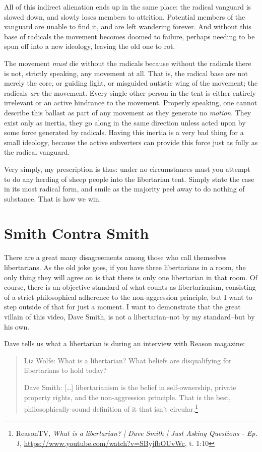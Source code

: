 \documentclass[11pt]{article}
\begin{document}
All of this indirect alienation ends up in the same place: the radical vanguard is slowed down, and slowly loses members to attrition. Potential members of the vanguard are unable to find it, and are left wandering forever. And without this base of radicals the movement becomes doomed to failure, perhaps needing to be spun off into a new ideology, leaving the old one to rot.

The movement \emph{must} die without the radicals because without the radicals there is not, strictly speaking, any movement at all. That is, the radical base are not merely the core, or guiding light, or misguided autistic wing of the movement; the radicals \emph{are} the movement. Every single other person in the tent is either entirely irrelevant or an active hindrance to the movement. Properly speaking, one cannot describe this ballast as part of any movement as they generate no \emph{motion}. They exist only as inertia, they go along in the same direction unless acted upon by some force generated by radicals. Having this inertia is a very bad thing for a small ideology, because the active subverters can provide this force just as fully as the radical vanguard.

Very simply, my prescription is thus: under no circumstances must you attempt to do any herding of sheep people into the libertarian tent. Simply state the case in its most radical form, and smile as the majority peel away to do nothing of substance. That is how we win.
\section{Smith Contra Smith}
\label{sec:orged01f03}
There are a great many disagreements among those who call themselves libertarians. As the old joke goes, if you have three libertarians in a room, the only thing they will agree on is that there is only one libertarian in that room. Of course, there is an objective standard of what counts as libertarianism, consisting of a strict philosophical adherence to the non-aggression principle, but I want to step outside of that for just a moment. I want to demonstrate that the great villain of this video, Dave Smith, is not a libertarian--not by my standard--but by his own.

Dave tells us what a libertarian is during an interview with Reason magazine:
\begin{quote}
Liz Wolfe: What is a libertarian? What beliefs are disqualifying for libertarians to hold today?

Dave Smith: [\ldots{}] libertarianism is the belief in self-ownership, private property rights, and the non-aggression principle. That is the best, philosophically-sound definition of it that isn't circular.\footnote{ReasonTV, \emph{What is a libertarian? | Dave Smith | Just Asking Questions - Ep. 1}, \url{https://www.youtube.com/watch?v=SByjfbOUvWc}, t. 1:10}
\end{quote}
\end{document}
